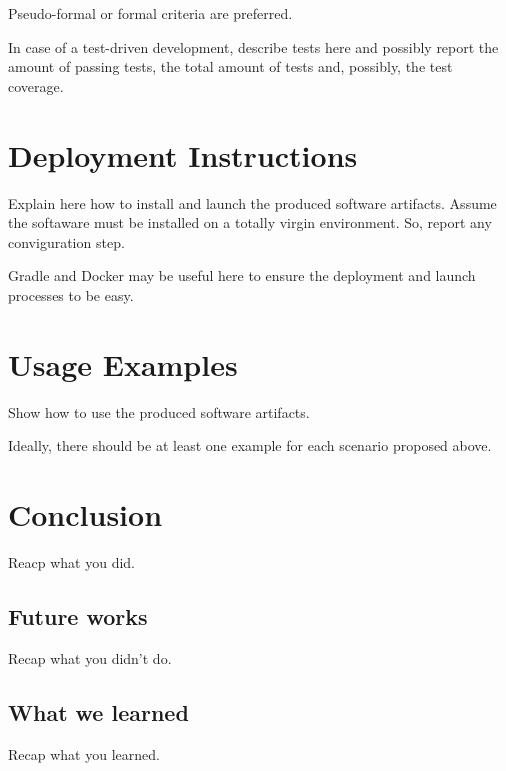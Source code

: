 \documentclass[12pt,a4paper,oneside,article]{article}
\begin{document}
		Pseudo-formal or formal criteria are preferred.
		
		In case of a test-driven development, describe tests here and possibly report the amount of passing tests, the total amount of tests and, possibly, the test coverage.
		
	\section{Deployment Instructions}
		Explain here how to install and launch the produced software artifacts. Assume the softaware must be installed on a totally virgin environment. So, report any conviguration step.
		
		Gradle and Docker may be useful here to ensure the deployment and launch processes to be easy.
		
	\section{Usage Examples}
		Show how to use the produced software artifacts.
		
		Ideally, there should be at least one example for each scenario proposed above.
		
	\section{Conclusion}
		Reacp what you did.
		
		\subsection{Future works}
			Recap what you didn't do.
		
		\subsection{What we learned}
			Recap what you learned.
			
	\printbibliography
\end{document}
